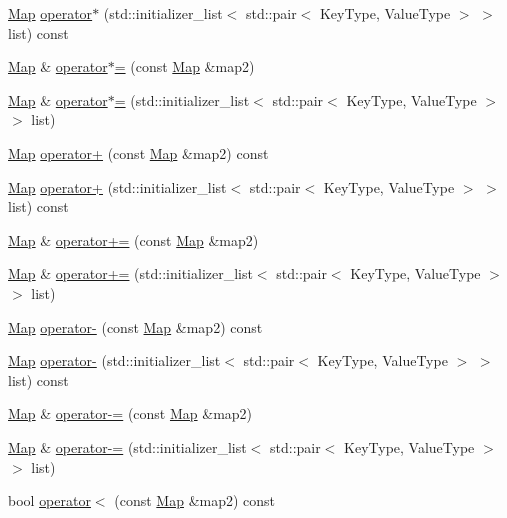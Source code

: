 \begin{DoxyCompactItemize}
\mbox{\hyperlink{classMap}{Map}} \mbox{\hyperlink{classMap_afe04702252ed63484b973ce6ee66c8c5}{operator$\ast$}} (std\+::initializer\+\_\+list$<$ std\+::pair$<$ Key\+Type, Value\+Type $>$ $>$ list) const
\item 
\mbox{\hyperlink{classMap}{Map}} \& \mbox{\hyperlink{classMap_a5d455253cf7b430025844b814f60f81d}{operator$\ast$=}} (const \mbox{\hyperlink{classMap}{Map}} \&map2)
\item 
\mbox{\hyperlink{classMap}{Map}} \& \mbox{\hyperlink{classMap_a08c8874c72372169781e46a36bab97a5}{operator$\ast$=}} (std\+::initializer\+\_\+list$<$ std\+::pair$<$ Key\+Type, Value\+Type $>$ $>$ list)
\item 
\mbox{\hyperlink{classMap}{Map}} \mbox{\hyperlink{classMap_af25292376af863c7defa9dd9a378d383}{operator+}} (const \mbox{\hyperlink{classMap}{Map}} \&map2) const
\item 
\mbox{\hyperlink{classMap}{Map}} \mbox{\hyperlink{classMap_a3fb55aac55ebd09ffd989a48627d2ab9}{operator+}} (std\+::initializer\+\_\+list$<$ std\+::pair$<$ Key\+Type, Value\+Type $>$ $>$ list) const
\item 
\mbox{\hyperlink{classMap}{Map}} \& \mbox{\hyperlink{classMap_ac0478d198f73f2a6c45c03e453faa538}{operator+=}} (const \mbox{\hyperlink{classMap}{Map}} \&map2)
\item 
\mbox{\hyperlink{classMap}{Map}} \& \mbox{\hyperlink{classMap_a42f7fe44b1c670571d749a6a02b9702a}{operator+=}} (std\+::initializer\+\_\+list$<$ std\+::pair$<$ Key\+Type, Value\+Type $>$ $>$ list)
\item 
\mbox{\hyperlink{classMap}{Map}} \mbox{\hyperlink{classMap_a68704368f8cfa5ea173c0dfc95c75920}{operator-\/}} (const \mbox{\hyperlink{classMap}{Map}} \&map2) const
\item 
\mbox{\hyperlink{classMap}{Map}} \mbox{\hyperlink{classMap_a47ec48c18c6f07358c8e8810f027984d}{operator-\/}} (std\+::initializer\+\_\+list$<$ std\+::pair$<$ Key\+Type, Value\+Type $>$ $>$ list) const
\item 
\mbox{\hyperlink{classMap}{Map}} \& \mbox{\hyperlink{classMap_a5c6ee663a9c3956c53220cfff8659f1c}{operator-\/=}} (const \mbox{\hyperlink{classMap}{Map}} \&map2)
\item 
\mbox{\hyperlink{classMap}{Map}} \& \mbox{\hyperlink{classMap_a627c9183807211699369ce4a6e763e33}{operator-\/=}} (std\+::initializer\+\_\+list$<$ std\+::pair$<$ Key\+Type, Value\+Type $>$ $>$ list)
\item 
bool \mbox{\hyperlink{classMap_aa7853d8fda7f6e2e8a353dfed157c376}{operator$<$}} (const \mbox{\hyperlink{classMap}{Map}} \&map2) const

\end{DoxyCompactItemize}
